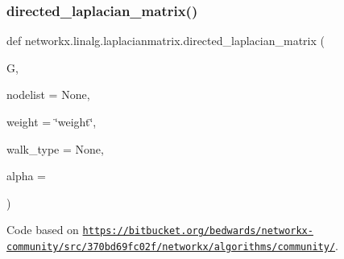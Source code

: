 \subsubsection{\texorpdfstring{directed\+\_\+laplacian\+\_\+matrix()}{directed\_laplacian\_matrix()}}
{\footnotesize\ttfamily def networkx.\+linalg.\+laplacianmatrix.\+directed\+\_\+laplacian\+\_\+matrix (\begin{DoxyParamCaption}\item[{}]{G,  }\item[{}]{nodelist = {\ttfamily None},  }\item[{}]{weight = {\ttfamily \char`\"{}weight\char`\"{}},  }\item[{}]{walk\+\_\+type = {\ttfamily None},  }\item[{}]{alpha = {} }\end{DoxyParamCaption})}



Code based on \href{https://bitbucket.org/bedwards/networkx-community/src/370bd69fc02f/networkx/algorithms/community/}{\tt https\+://bitbucket.\+org/bedwards/networkx-\/community/src/370bd69fc02f/networkx/algorithms/community/}. 

